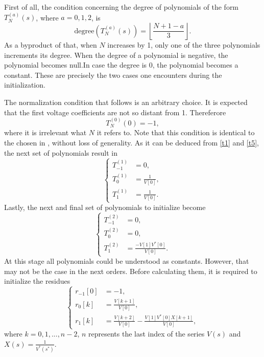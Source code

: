 \documentclass[journal]{IEEEtran}
\begin{document}
First of all, the condition concerning the degree of polynomials of the form $T^{(a)}_N(s)$, where $a=0,1,2$, is
\begin{equation}
  \text{degree}\left(T^{(a)}_N(s)\right)=\left\lfloor\frac{N+1-a}{3}\right\rfloor.
  \label{t5}
\end{equation}
As a byproduct of that, when $N$ increases by 1, only one of the three polynomials increments its degree. When the degree of a polynomial is negative, the polynomial becomes null.In case the degree is 0, the polynomial becomes a constant. These are precisely the two cases one encounters during the initialization.

The normalization condition that follows is an arbitrary choice. It is expected that the first voltage coefficients are not so distant from 1. Thereferore
\begin{equation}
  T^{(0)}_N(0)=-1,
  \label{t6}
\end{equation}
where it is irrelevant what $N$ it refers to. Note that this condition is identical to the chosen in \cite{Trias2018}, without loss of generality. As it can be deduced from \eqref{t1} and \eqref{t5}, the next set of polynomials result in
\begin{equation}
  \begin{cases}
    T^{(1)}_{-1}&=0,\\
    T^{(1)}_{0}&=\frac{1}{V[0]},\\
    T^{(1)}_{1}&=\frac{1}{V[0]}.
  \end{cases}
  \label{t7}
\end{equation}
Lastly, the next and final set of polynomials to initialize become
\begin{equation}
  \begin{cases}
    T^{(2)}_{-1}&=0,\\
    T^{(2)}_{0}&=0,\\
    T^{(2)}_{1}&=\frac{-V[1]V^*[0]}{V[0]}.
  \end{cases}
  \label{t8}
\end{equation}
At this stage all polynomials could be understood as constants. However, that may not be the case in the next orders. Before calculating them, it is required to initialize the residues
\begin{equation}
  \begin{cases}
   r_{-1}[0]&=-1,\\ 
   r_0[k]&=\frac{V[k+1]}{V[0]},\\
   r_1[k]&=\frac{V[k+2]}{V[0]}-\frac{V[1]V^*[0]X[k+1]}{V[0]},
  \end{cases}
  \label{t9}
\end{equation}
where $k=0,1,...,n-2$, $n$ represents the last index of the series $V(s)$ and $X(s)=\frac{1}{V^*(s^*)}$.
\end{document}
